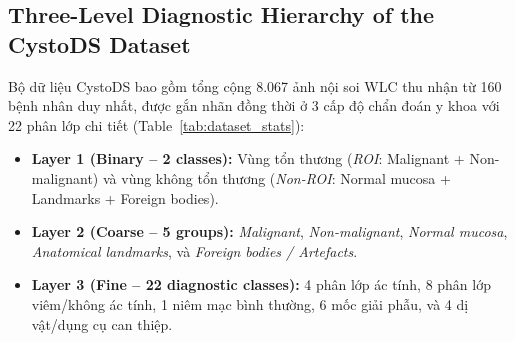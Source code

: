 \documentclass[runningheads]{llncs}
\begin{document}
\subsection{Three-Level Diagnostic Hierarchy of the CystoDS Dataset}
Bộ dữ liệu CystoDS \cite{ref_lee2026cystods} bao gồm tổng cộng 8.067 ảnh nội soi WLC thu nhận từ 160 bệnh nhân duy nhất, được gắn nhãn đồng thời ở 3 cấp độ chẩn đoán y khoa với 22 phân lớp chi tiết (Table~\ref{tab:dataset_stats}):
\begin{itemize}
    \item \textbf{Layer 1 (Binary -- 2 classes):} Vùng tổn thương (\textit{ROI}: Malignant + Non-malignant) và vùng không tổn thương (\textit{Non-ROI}: Normal mucosa + Landmarks + Foreign bodies).
    \item \textbf{Layer 2 (Coarse -- 5 groups):} \textit{Malignant}, \textit{Non-malignant}, \textit{Normal mucosa}, \textit{Anatomical landmarks}, và \textit{Foreign bodies / Artefacts}.
    \item \textbf{Layer 3 (Fine -- 22 diagnostic classes):} 4 phân lớp ác tính, 8 phân lớp viêm/không ác tính, 1 niêm mạc bình thường, 6 mốc giải phẫu, và 4 dị vật/dụng cụ can thiệp.
\end{itemize}
\end{document}
